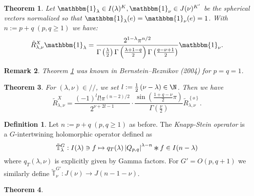 \documentclass[portrait,final,paperwidth=90cm,paperheight=120cm,fontscale=0.3]{baposter}
\newcommand{\Conv}{\mathop{\scalebox{1.5}{\raisebox{-0.2ex}{$\ast$}}}}
\newtheorem{theorem}{Theorem}
\newcommand{\Hom}{\mbox{\normalfont Hom}}
\newcommand{\Sol}{\mathcal{S}\!{\it ol}}
\newtheorem{remark}[theorem]{Remark}
\theoremstyle{definition}
\newtheorem{definition}{Definition}
\renewcommand{\Q}{Q_{p,q}}
\begin{document}
\begin{poster}
{%
}
{
\begin{theorem}\label{thm:spherical}
	Let $\mathbbm{1}_\lambda\in I(\lambda)^K,\mathbbm{1}_\nu\in J(\nu)^{K'}$ be the spherical vectors normalized so that $\mathbbm{1}_\lambda(e)=\mathbbm{1}_\nu(e)=1$.
	With $n:=p+q\;(p,q\ge1)$ we have:
\[ \tilde{R}^X_{\lambda, \nu} \mathbbm{1}_{\lambda} =  \frac{2^{1 -
\lambda}\pi^{n / 2}}{\Gamma \left( \frac{\lambda}{2} \right)
\Gamma \left(  \frac{\lambda + 1-q}{2} \right) \Gamma \left(
\frac{q - \nu + 1}{2} \right)} \mathbbm{1}_{\nu}. \]
\end{theorem}
\begin{remark}
	Theorem \ref{thm:spherical} was known in Bernstein--Reznikov (2004) for $p=q=1$.
\end{remark}
}
{
\begin{theorem}
	For $(\lambda,\nu)\in//$, we set $l:=\frac{1}{2}\left( \nu-\lambda \right)\in\N$. Then we have
  \[\tilde{R}_{\lambda,\nu}^X  = \frac{ (- 1)^l l!\pi^{(n - 2) / 2} 
		}{2^{ \nu + 2 l-1}}\cdot  \frac{\sin\left( \frac{1+q-\nu}{2}\pi \right)}{\Gamma\left( \frac{\nu}{2} \right)}
	\tilde{R}_{\lambda,\nu}^{ \left\{ o \right\} }.\]
	\end{theorem}
}
{
	\begin{definition}
		Let $n:=p+q\;(p,q\ge1)$ as before.
		The {\it Knapp-Stein operator} is a $G$-intertwining holomorphic operator defined as
		\begin{equation*}
		\tilde{\mathbb{T}}_{\lambda}^G:I(\lambda)\ni f\mapsto q_T(\lambda)\myabs{\Q}^{\lambda-n}\Conv f\in I(n-\lambda)
		\end{equation*}
		where $q_T(\lambda,\nu)$ is explicitly given by Gamma factors.
		For $G'=O(p,q+1)$ we similarly define $\tilde{\mathbb{T}}^{G'}_\nu:J(\nu)\to J(n-1-\nu)$.
	\end{definition}
	\begin{theorem}
		

\end{theorem}}
\end{poster}
\end{document}
